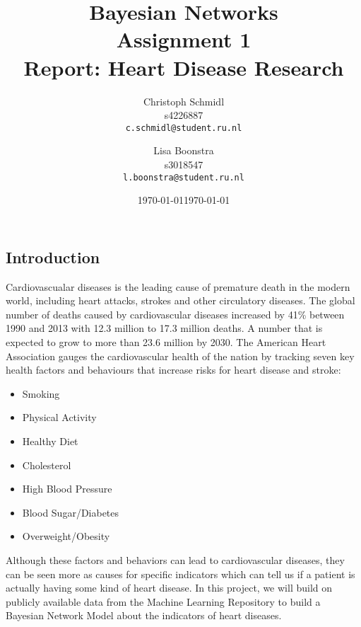 \documentclass[a4paper]{article}
\title{Bayesian Networks\\Assignment 1\\Report: Heart Disease Research}
\author{
  Christoph Schmidl\\ s4226887\\      \texttt{c.schmidl@student.ru.nl}
  \and
  Lisa Boonstra\\ s3018547\\     \texttt{l.boonstra@student.ru.nl}
}
\date{\today}
\date{\today}
\begin{document}
\maketitle


\subsection*{Introduction}

Cardiovascualar diseases is the leading cause of premature death in the modern world, including heart attacks, strokes and other circulatory diseases.
The global number of deaths caused by cardiovascular diseases increased by 41\% between 1990 and 2013 with 12.3 million to 17.3 million deaths. A number that is expected to grow to more than 23.6 million by 2030.
The American Heart Association gauges the cardiovascular health of the nation by tracking seven key health factors and behaviours that increase risks for heart disease and stroke:

\vspace{1em}
\begin{varwidth}[t]{.5\textwidth}
\begin{itemize}
	\item Smoking
	\item Physical Activity
	\item Healthy Diet
\end{itemize}
\end{varwidth}%
\hspace{4em}%
\begin{varwidth}[t]{.5\textwidth}
\begin{itemize}
	\item Cholesterol
	\item High Blood Pressure
	\item Blood Sugar/Diabetes
\end{itemize}
\end{varwidth}
\hspace{4em}%
\begin{varwidth}[t]{.5\textwidth}
\begin{itemize}
	\item Overweight/Obesity
\end{itemize}
\end{varwidth}
\vspace{1em}


Although these factors and behaviors can lead to cardiovascular diseases, they can be seen more as causes for specific indicators which can tell us if a patient is actually having some kind of heart disease.
In this project, we will build on publicly available data from the Machine Learning Repository to build a Bayesian Network Model about the indicators of heart diseases.
\end{document}
